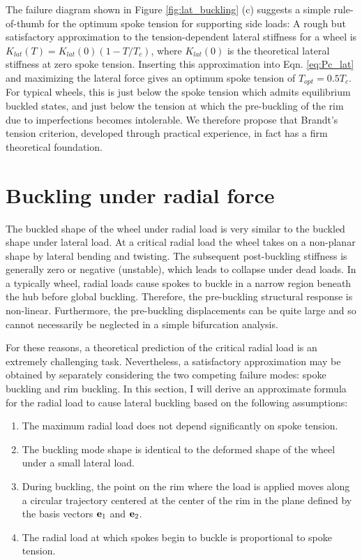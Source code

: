 \documentclass[\rootdir/thesis.tex]{subfiles}
\begin{document}
The failure diagram shown in Figure \ref{fig:lat_buckling} (c) suggests a simple rule-of-thumb for the optimum spoke tension for supporting side loads: A rough but satisfactory approximation to the tension-dependent lateral stiffness for a wheel is $K_{lat} (T)=K_{lat} (0)(1-T/T_c)$, where $K_{lat} (0)$ is the theoretical lateral stiffness at zero spoke tension. Inserting this approximation into Eqn. \eqref{eq:Pc_lat} and maximizing the lateral force gives an optimum spoke tension of $T_{opt} = 0.5 T_c$. For typical wheels, this is just below the spoke tension which admits equilibrium buckled states, and just below the tension at which the pre-buckling of the rim due to imperfections becomes intolerable. We therefore propose that Brandt's tension criterion, developed through practical experience, in fact has a firm theoretical foundation.


\section{Buckling under radial force}

The buckled shape of the wheel under radial load is very similar to the buckled shape under lateral load. At a critical radial load the wheel takes on a non-planar shape by lateral bending and twisting. The subsequent post-buckling stiffness is generally zero or negative (unstable), which leads to collapse under dead loads. In a typically wheel, radial loads cause spokes to buckle in a narrow region beneath the hub before global buckling. Therefore, the pre-buckling structural response is non-linear. Furthermore, the pre-buckling displacements can be quite large and so cannot necessarily be neglected in a simple bifurcation analysis.

For these reasons, a theoretical prediction of the critical radial load is an extremely challenging task. Nevertheless, a satisfactory approximation may be obtained by separately considering the two competing failure modes: spoke buckling and rim buckling. In this section, I will derive an approximate formula for the radial load to cause lateral buckling based on the following assumptions:

\begin{enumerate}
\item{The maximum radial load does not depend significantly on spoke tension.}\label{assum:no_T_effect}
\item{The buckling mode shape is identical to the deformed shape of the wheel under a small lateral load.}\label{assum:lat_shape}
\item{During buckling, the point on the rim where the load is applied moves along a circular trajectory centered at the center of the rim in the plane defined by the basis vectors $\mathbf{e}_1$ and $\mathbf{e}_2$.}\label{assum:circ_path}
\item{The radial load at which spokes begin to buckle is proportional to spoke tension.}\label{assum:Psb_T}
\end{enumerate}
\end{document}
